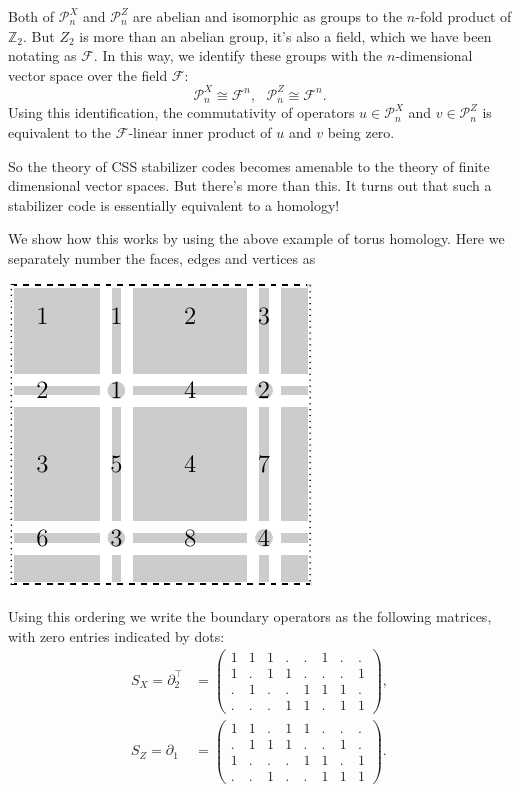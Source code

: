 \documentclass[11pt,twoside,openright]{report}
\def\Z{\mathbb{Z}}
\def\Pauli{\mathcal{P}}
\newcommand{\Field}{\mathcal{F}}
\begin{document}
Both of $\Pauli_n^X$ and $\Pauli_n^Z$ are abelian and
isomorphic as groups to the $n$-fold product of $\Z_2$.
But $Z_2$ is more than an abelian group, it's also a field,
which we have been notating as $\Field.$
In this way, we identify these groups with the $n$-dimensional
vector space over the field $\Field:$
$$
\Pauli_n^X \cong \Field^n,\ \ \ 
\Pauli_n^Z \cong \Field^n.
$$
Using this identification, the commutativity of 
operators $u\in\Pauli_n^X$ and $v\in\Pauli_n^Z$
is equivalent to the $\Field$-linear
inner product of $u$ and $v$ being zero.

So the theory of CSS stabilizer codes becomes 
amenable to the theory of finite dimensional vector
spaces. But there's more than this.
It turns out that such a stabilizer code 
is essentially equivalent to a homology!

We show how this works by 
using the above example of torus homology.
Here we separately number
the faces, edges and vertices as
\begin{center}
\includegraphics{pic-torus-count.pdf}
\end{center}
Using this ordering 
we write 
the boundary operators as the following matrices, with
zero entries indicated by dots:
\begin{align*}
S_X = \partial_2^{\top} &= \left( \begin{array}{cccccccc}
1&1&1&.&.&1&.&.\\
1&.&1&1&.&.&.&1\\
.&1&.&.&1&1&1&.\\
.&.&.&1&1&.&1&1
\end{array} \right),\\
S_Z = \partial_1 &= \left( \begin{array}{cccccccc}
1&1&.&1&1&.&.&.\\
.&1&1&1&.&.&1&.\\
1&.&.&.&1&1&.&1\\
.&.&1&.&.&1&1&1
\end{array} \right).
\end{align*}
\end{document}
